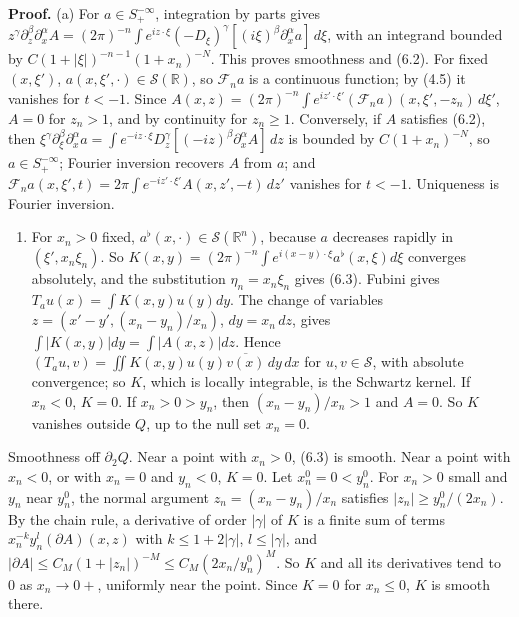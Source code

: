 \documentclass[
  11pt,
]{article}
\providecommand{\tightlist}{%
  \setlength{\itemsep}{0pt}\setlength{\parskip}{0pt}}
\begin{document}
\textbf{Proof.} (a) For \(a\in S^{-\infty}_+\), integration by parts
gives
\(z^\gamma\partial^\beta_z\partial^\alpha_xA=(2\pi)^{-n}\int e^{iz\cdot\xi}(-D_\xi)^\gamma[(i\xi)^\beta\partial^\alpha_xa]\,d\xi\),
with an integrand bounded by \(C(1+|\xi|)^{-n-1}(1+x_n)^{-N}\). This
proves smoothness and (6.2). For fixed \((x,\xi')\),
\(a(x,\xi',\cdot)\in\mathcal S(\mathbb R)\), so \(\mathcal F_na\) is a
continuous function; by (4.5) it vanishes for \(t<-1\). Since
\(A(x,z)=(2\pi)^{-n}\int e^{iz'\cdot\xi'}(\mathcal F_na)(x,\xi',-z_n)\,d\xi'\),
\(A=0\) for \(z_n>1\), and by continuity for \(z_n\geq1\). Conversely,
if \(A\) satisfies (6.2), then
\(\xi^\gamma\partial_\xi^\beta\partial_x^\alpha a=\int e^{-iz\cdot\xi}D_z^\gamma[(-iz)^\beta\partial_x^\alpha A]\,dz\)
is bounded by \(C(1+x_n)^{-N}\), so \(a\in S^{-\infty}_+\); Fourier
inversion recovers \(A\) from \(a\); and
\(\mathcal F_na(x,\xi',t)=2\pi\int e^{-iz'\cdot\xi'}A(x,z',-t)\,dz'\)
vanishes for \(t<-1\). Uniqueness is Fourier inversion.

\begin{enumerate}
\def\labelenumi{(\alph{enumi})}
\setcounter{enumi}{1}
\tightlist
\item
  For \(x_n>0\) fixed, \(a^\flat(x,\cdot)\in\mathcal S(\mathbb R^n)\),
  because \(a\) decreases rapidly in \((\xi',x_n\xi_n)\). So
  \(K(x,y)=(2\pi)^{-n}\int e^{i(x-y)\cdot\xi}a^\flat(x,\xi)d\xi\)
  converges absolutely, and the substitution \(\eta_n=x_n\xi_n\) gives
  (6.3). Fubini gives \(T_au(x)=\int K(x,y)u(y)dy\). The change of
  variables \(z=(x'-y',(x_n-y_n)/x_n)\), \(dy=x_n\,dz\), gives
  \(\int|K(x,y)|dy=\int|A(x,z)|dz\). Hence
  \((T_au,v)=\iint K(x,y)u(y)\overline{v(x)}\,dy\,dx\) for
  \(u,v\in\mathcal S\), with absolute convergence; so \(K\), which is
  locally integrable, is the Schwartz kernel. If \(x_n<0\), \(K=0\). If
  \(x_n>0>y_n\), then \((x_n-y_n)/x_n>1\) and \(A=0\). So \(K\) vanishes
  outside \(Q\), up to the null set \(x_n=0\).
\end{enumerate}

Smoothness off \(\partial_2Q\). Near a point with \(x_n>0\), (6.3) is
smooth. Near a point with \(x_n<0\), or with \(x_n=0\) and \(y_n<0\),
\(K=0\). Let \(x^0_n=0<y^0_n\). For \(x_n>0\) small and \(y_n\) near
\(y^0_n\), the normal argument \(z_n=(x_n-y_n)/x_n\) satisfies
\(|z_n|\geq y^0_n/(2x_n)\). By the chain rule, a derivative of order
\(|\gamma|\) of \(K\) is a finite sum of terms
\(x_n^{-k}y_n^l(\partial A)(x,z)\) with \(k\leq1+2|\gamma|\),
\(l\leq|\gamma|\), and
\(|\partial A|\leq C_M(1+|z_n|)^{-M}\leq C_M(2x_n/y^0_n)^M\). So \(K\)
and all its derivatives tend to 0 as \(x_n\to0+\), uniformly near the
point. Since \(K=0\) for \(x_n\leq0\), \(K\) is smooth there.
\end{document}
